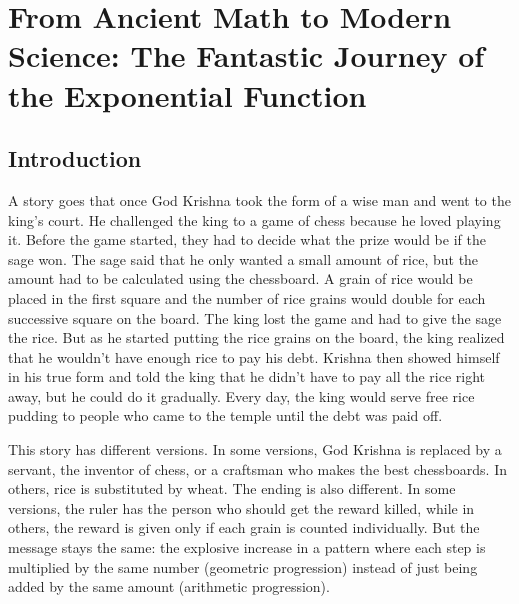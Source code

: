 \chapter{From Ancient Math to Modern Science: The Fantastic Journey of the Exponential Function}
\label{ch:03} 



\vspace{1cm}

\section{Introduction}

A story goes that once God Krishna took the form of a wise man and went to the king's court. He challenged the king to a game of chess because he loved playing it. Before the game started, they had to decide what the prize would be if the sage won. The sage said that he only wanted a small amount of rice, but the amount had to be calculated using the chessboard. A grain of rice would be placed in the first square and the number of rice grains would double for each successive square on the board. The king lost the game and had to give the sage the rice. But as he started putting the rice grains on the board, the king realized that he wouldn't have enough rice to pay his debt. Krishna then showed himself in his true form and told the king that he didn't have to pay all the rice right away, but he could do it gradually. Every day, the king would serve free rice pudding to people who came to the temple until the debt was paid off.

This story has different versions. In some versions, God Krishna is replaced by a servant, the inventor of chess, or a craftsman who makes the best chessboards. In others, rice is substituted by wheat. The ending is also different. In some versions, the ruler has the person who should get the reward killed, while in others, the reward is given only if each grain is counted individually. But the message stays the same: the explosive increase in a pattern where each step is multiplied by the same number (geometric progression) instead of just being added by the same amount (arithmetic progression).

